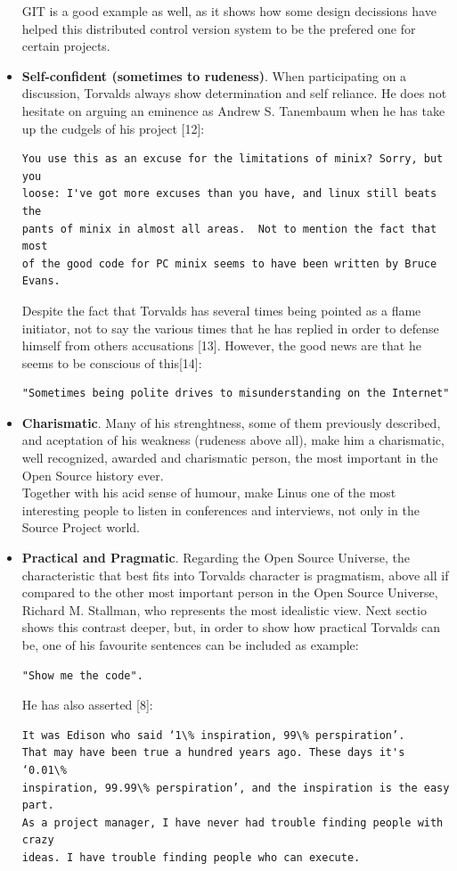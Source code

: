 \documentclass[11pt]{article}
\begin{document}
\begin{itemize}
GIT is a good example as well, as it shows how some design decissions have helped this distributed control version system to be the prefered one for certain projects. 
\item{\textbf{Self-confident (sometimes to rudeness)}.}
When participating on a discussion, Torvalds always show determination and self reliance. He does not hesitate on arguing an eminence as Andrew S. Tanembaum when he has take up the cudgels of his project [12]: 
\begin{verbatim}
You use this as an excuse for the limitations of minix? Sorry, but you
loose: I've got more excuses than you have, and linux still beats the
pants of minix in almost all areas.  Not to mention the fact that most
of the good code for PC minix seems to have been written by Bruce Evans.
\end{verbatim}
Despite the fact that Torvalds has several times being pointed as a flame initiator, not to say the various times that he has replied in order to defense himself from others accusations [13]. However, the good news are that he seems to be conscious of this[14]:
\begin{verbatim}
"Sometimes being polite drives to misunderstanding on the Internet"
\end{verbatim}
\item{\textbf{Charismatic}.} Many of his strenghtness, some of them previously described, and aceptation of his weakness (rudeness above all), make him a charismatic, well recognized, awarded and charismatic person, the most important in the Open Source history ever.\\
Together with his acid sense of humour, make Linus one of the most interesting people to listen in conferences and interviews, not only in the Source Project world.
\item{\textbf{Practical and Pragmatic}.}
Regarding the Open Source Universe, the characteristic that best fits into Torvalds character is pragmatism, above all if compared to the other most important person in the Open Source Universe, Richard M. Stallman, who represents the most idealistic view. Next sectio shows this contrast deeper, but, in order to show how practical Torvalds can be, one of his favourite sentences can be included as example:
\begin{verbatim}
"Show me the code". 
\end{verbatim}
He has also asserted [8]:
\begin{verbatim}
It was Edison who said ‘1\% inspiration, 99\% perspiration’.
That may have been true a hundred years ago. These days it's ‘0.01\%
inspiration, 99.99\% perspiration’, and the inspiration is the easy part. 
As a project manager, I have never had trouble finding people with crazy 
ideas. I have trouble finding people who can execute.
\end{verbatim}
\end{itemize}
\end{document}
